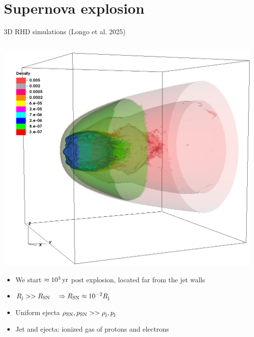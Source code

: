 \section{Supernova explosion}

\begin{frame}{3D RHD simulations (Longo et al. 2025)}
	\begin{columns}

		{\footnotesize
		\begin{column}{0.5\textwidth}
		\includegraphics[width=\textwidth]{images/3d_shot_rho.png}
				\vspace{-.5cm}
		 \begin{itemize}
		  \item We start $\approx 10^{3}\,{\rm yr}$ post explosion,
		 				located far from the jet walls
		  \item $R_{\rm j} >> R_{\rm SN}\quad \Rightarrow R_{\rm SN}\approx 10^{-2} R_{\rm j}$ \\
		  \item  Uniform ejecta $\rho_{\rm SN},p_{\rm SN}>>\rho_{\rm j},p_{\rm j}$
		  \item Jet and ejecta: ionized gas of protons and electrons
		 \end{itemize}


\end{column}}
\end{columns}
\end{frame}
